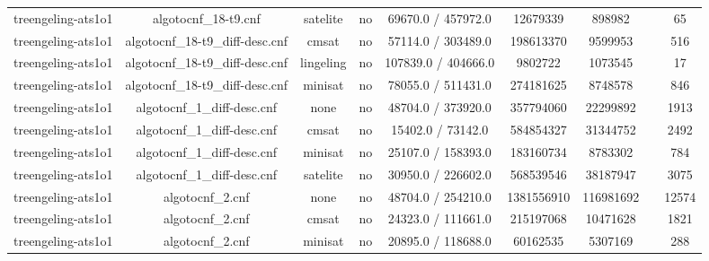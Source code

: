 \begin{appendices}
\begin{table}[p]
\begin{center}
\begin{tabular}{l|cccccccc}
  treengeling-ats1o1             & algotocnf\_18-t9.cnf           & satelite   & no    & 69670.0 / 457972.0 & 12679339  & 898982    &            & 65 \\ %
  treengeling-ats1o1             & algotocnf\_18-t9\_diff-desc.cnf & cmsat      & no    & 57114.0 / 303489.0 & 198613370 & 9599953   &            & 516 \\ %
  treengeling-ats1o1             & algotocnf\_18-t9\_diff-desc.cnf & lingeling  & no    & 107839.0 / 404666.0 & 9802722   & 1073545   &            & 17 \\ %
  treengeling-ats1o1             & algotocnf\_18-t9\_diff-desc.cnf & minisat    & no    & 78055.0 / 511431.0 & 274181625 & 8748578   &            & 846 \\ %
  treengeling-ats1o1             & algotocnf\_1\_diff-desc.cnf    & none       & no    & 48704.0 / 373920.0 & 357794060 & 22299892  &            & 1913 \\ %
  treengeling-ats1o1             & algotocnf\_1\_diff-desc.cnf    & cmsat      & no    & 15402.0 / 73142.0 & 584854327 & 31344752  &            & 2492 \\ %
  treengeling-ats1o1             & algotocnf\_1\_diff-desc.cnf    & minisat    & no    & 25107.0 / 158393.0 & 183160734 & 8783302   &            & 784 \\ %
  treengeling-ats1o1             & algotocnf\_1\_diff-desc.cnf    & satelite   & no    & 30950.0 / 226602.0 & 568539546 & 38187947  &            & 3075 \\ %
  treengeling-ats1o1             & algotocnf\_2.cnf               & none       & no    & 48704.0 / 254210.0 & 1381556910 & 116981692 &            & 12574 \\ %
  treengeling-ats1o1             & algotocnf\_2.cnf               & cmsat      & no    & 24323.0 / 111661.0 & 215197068 & 10471628  &            & 1821 \\ %
  treengeling-ats1o1             & algotocnf\_2.cnf               & minisat    & no    & 20895.0 / 118688.0 & 60162535  & 5307169   &            & 288 \\ %

\end{tabular}
\end{center}
\end{table}
\end{appendices}
